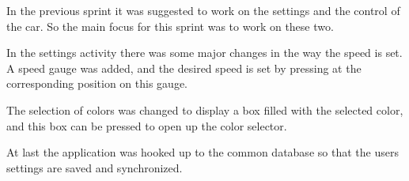 In the previous sprint it was suggested to work on the settings and the control of the car.
So the main focus for this sprint was to work on these two.

In the settings activity there was some major changes in the way the speed is set.
A speed gauge was added, and the desired speed is set by pressing at the corresponding position on this gauge.

The selection of colors was changed to display a box filled with the selected color, and this box can be pressed to open up the color selector.


At last the application was hooked up to the common database so that the users settings are saved and synchronized.

